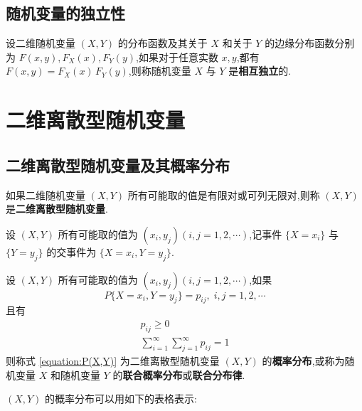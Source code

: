 \subsection{随机变量的独立性}

\begin{definition}
    设二维随机变量 $(X,Y)$ 的分布函数及其关于 $X$ 和关于 $Y$ 的边缘分布函数分别为 $F(x,y), F_{X}(x), F_{Y}(y)$,如果对于任意实数 $x,y$,都有 $F(x,y)=F_{X}(x)\,F_{Y}(y)$,则称随机变量 $X$ 与 $Y$ 是\textbf{相互独立}的.
\end{definition}

\section{二维离散型随机变量}

\subsection{二维离散型随机变量及其概率分布}

\begin{definition}
    如果二维随机变量 $(X,Y)$ 所有可能取的值是有限对或可列无限对,则称 $(X,Y)$ 是\textbf{二维离散型随机变量}.
\end{definition}

设 $(X,Y)$ 所有可能取的值为 $(x_i,y_j)(i,j=1,2,\cdots)$,记事件 $\{X=x_i\}$ 与 $\{Y=y_j\}$ 的交事件为 $\{X=x_i, Y=y_j\}$.

\begin{definition}
    设 $(X,Y)$ 所有可能取的值为 $(x_i,y_j)(i,j=1,2,\cdots)$,如果
    \begin{equation} \label{equation:P(X,Y)}
        P\{X=x_i, Y=y_j\} = p_{ij}, \; i,j=1,2,\cdots
    \end{equation}
    且有
    \begin{gather*}
        p_{ij} \geqslant 0 \\
        \sum_{i=1}^\infty \sum_{j=1}^\infty p_{ij} = 1
    \end{gather*}
    则称式 \eqref{equation:P(X,Y)} 为二维离散型随机变量 $(X,Y)$ 的\textbf{概率分布},或称为随机变量 $X$ 和随机变量 $Y$ 的\textbf{联合概率分布}或\textbf{联合分布律}.
\end{definition}

$(X,Y)$ 的概率分布可以用如下的表格表示:

